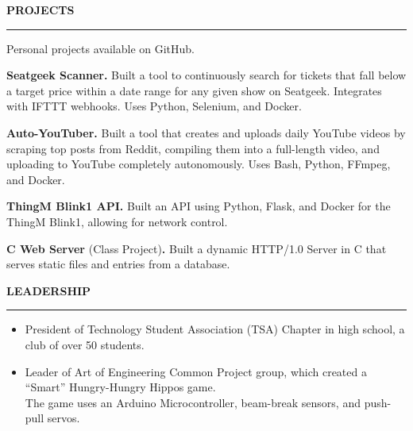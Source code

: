 \documentclass[10pt,letterpaper]{article}
\begin{document}
\medskip
\MakeUppercase{{\bf Projects}}
\medskip
\hrule
\begin{list}{}{\setlength{\leftmargin}{0em}}
    \item
          \vspace{-1.25em}
    \item {Personal projects available on GitHub. }
    \item \textbf{Seatgeek Scanner.} {Built a tool to continuously search for tickets that fall below a target price within a date range for any given show on Seatgeek. Integrates with IFTTT webhooks. Uses Python, Selenium, and Docker. }
    \item \textbf{Auto-YouTuber.} {Built a tool that creates and uploads daily YouTube videos by scraping top posts from Reddit, compiling them into a full-length video, and uploading to YouTube completely autonomously. Uses Bash, Python, FFmpeg, and Docker. }
    \item \textbf{ThingM Blink1 API.} {Built an API using Python, Flask, and Docker for the ThingM Blink1, allowing for network control.}
    \item \textbf{C Web Server} {(Class Project)\textbf{.} Built a dynamic HTTP/1.0 Server in C that serves static files and entries from a database.}
\end{list}



\medskip
\MakeUppercase{{\bf Leadership}}
\medskip
\hrule
\begin{list}{}{\setlength{\leftmargin}{0em}}
    \item
          \begin{itemize}
              \item President of Technology Student Association (TSA) Chapter in high school, a club of over 50 students.
              \item Leader of Art of Engineering Common Project group, which created a ``Smart'' Hungry-Hungry Hippos game.
                    \\ The game uses an Arduino Microcontroller, beam-break sensors, and push-pull servos.
          \end{itemize}
\end{list}
\end{document}
